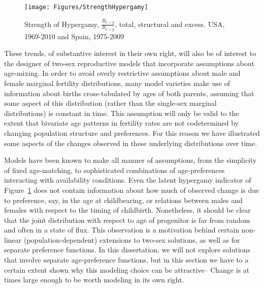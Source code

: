 \begin{figure}[!ht]
  \centering
    \caption{Strength of Hypergamy, $\frac{B_{x>y}}{B_{x<y}}$, total, structural
    and excess. USA, 1969-2010 and Spain, 1975-2009}
    \texttt{[image: Figures/StrengthHypergamy]}      
    \label{fig:HypergamyStrength}
\end{figure}

These trends, of substantive interest in their own right, will also be of
interest to the designer of two-sex reproductive models that incorporate
 assumptions about age-mixing. In order to avoid overly restrictive
 assumptions about male and female marginal fertility distributions, many
 model varieties make use of information about births cross-tabulated by
 ages of both parents, assuming that some aspect of this distribution
 (rather than the single-sex marginal distributions) is constant in time.
 This assumption will only be valid to the extent that bivariate age patterns in
 fertility rates are not codetermined by changing population structure and
 preferences. For this reason we have illustrated some aspects of the changes 
 observed in these underlying distributions over time. 
 
Models have been
 known to make all manner of assumptions, from the simplicity of 
 fixed age-matching, to sophisticated combinations of age-preferences 
 interacting with availability conditions. Even the latent hypergamy 
 indicator of Figure~\ref{fig:HypergamyStrength} does not contain information 
 about how much of observed change is due to preference, say, in the age at 
 childbearing, or relations between males and females with respect to the timing 
 of childbirth. Nonetheless, it should be clear that the joint distribution
with respect to age of progenitor is far from random and often in a state of
flux. This observation is a motivation behind certain non-linear
(population-dependent) extensions to two-sex solutions, as well as for separate
preference functions. In this dissertation, we will not explore solutions that
involve separate age-preference functions, but in this section we have to a
certain extent shown why this modeling choice can be attractive-- Change is at
times large enough to be worth modeling in its own right.
